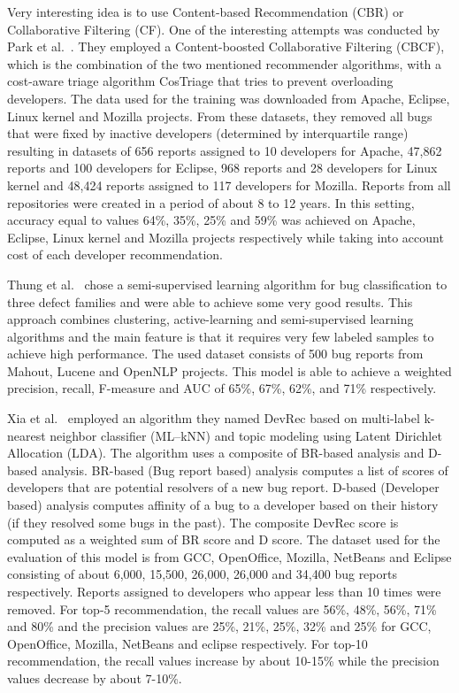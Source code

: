 Very interesting idea is to use Content-based Recommendation (CBR) or Collaborative Filtering (CF). One of the interesting attempts was conducted by Park et al.~\cite{Park2011}. They employed a Content-boosted Collaborative Filtering (CBCF), which is the combination of the two mentioned recommender algorithms, with a cost-aware triage algorithm CosTriage that tries to prevent overloading developers. The data used for the training was downloaded from Apache, Eclipse, Linux kernel and Mozilla projects. From these datasets, they removed all bugs that were fixed by inactive developers (determined by interquartile range) resulting in datasets of 656 reports assigned to 10 developers for Apache, 47,862 reports and 100 developers for Eclipse, 968 reports and 28 developers for Linux kernel and 48,424 reports assigned to 117 developers for Mozilla. Reports from all repositories were created in a period of about 8 to 12 years. In this setting, accuracy equal to values 64\%, 35\%, 25\% and 59\% was achieved on Apache, Eclipse, Linux kernel and Mozilla projects respectively while taking into account cost of each developer recommendation.

Thung et al.~\cite{Thung2015} chose a semi-supervised learning algorithm for bug classification to three defect families and were able to achieve some very good results. This approach combines clustering, active-learning and semi-supervised learning algorithms and the main feature is that it requires very few labeled samples to achieve high performance. The used dataset consists of 500 bug reports from Mahout, Lucene and OpenNLP projects. This model is able to achieve a weighted precision, recall, F-measure and AUC of 65\%, 67\%, 62\%, and 71\%
 respectively.

Xia et al.~\cite{Xia2015} employed an algorithm they named DevRec based on multi-label k-nearest neighbor classifier (ML--kNN) and topic modeling using Latent Dirichlet Allocation (LDA). The algorithm uses a composite of BR-based analysis and D-based analysis. BR-based (Bug report based) analysis computes a list of scores of developers that are potential resolvers of a new bug report. D-based (Developer based) analysis computes affinity of a bug to a developer based on their history (if they resolved some bugs in the past). The composite DevRec score is computed as a weighted sum of BR score and D score. The dataset used for the evaluation of this model is from GCC, OpenOffice, Mozilla, NetBeans and Eclipse consisting of about 6,000, 15,500, 26,000, 26,000 and 34,400 bug reports respectively. Reports assigned to developers who appear less than 10 times were removed. For top-5 recommendation, the recall values are 56\%, 48\%, 56\%, 71\% and 80\% and the precision values are 25\%, 21\%, 25\%, 32\% and 25\% for GCC, OpenOffice, Mozilla, NetBeans and eclipse respectively. For top-10 recommendation, the recall values increase by about 10-15\% while the precision values decrease by about 7-10\%.

